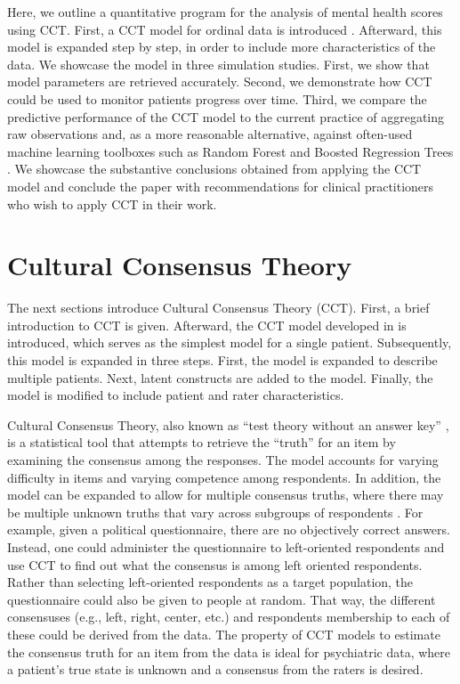 \documentclass{article}
\begin{document}
Here, we outline a quantitative program for the analysis of mental health scores using CCT. First, a CCT model for ordinal data is introduced \cite{Anders2015cultural}. Afterward, this model is expanded step by step, in order to include more characteristics of the data. We showcase the model in three simulation studies. First, we show that model parameters are retrieved accurately. Second, we demonstrate how CCT could be used to monitor patients progress over time. Third, we compare the predictive performance of the CCT model to the current practice of aggregating raw observations and, as a more reasonable alternative, against often-used machine learning toolboxes such as Random Forest \cite{breiman2001random} and Boosted Regression Trees \cite{friedman2002stochastic}. We showcase the substantive conclusions obtained from applying the CCT model and conclude the paper with recommendations for clinical practitioners who wish to apply CCT in their work.

\section*{Cultural Consensus Theory}
The next sections introduce Cultural Consensus Theory (CCT). First, a brief introduction to CCT is given. Afterward, the CCT model developed in  is introduced, which serves as the simplest model for a single patient. Subsequently, this model is expanded in three steps. First, the model is expanded to describe multiple patients. Next, latent constructs are added to the model. Finally, the model is modified to include patient and rater characteristics.

Cultural Consensus Theory, also known as ``test theory without an answer key'' \cite{batchelder1988test}, is a statistical tool that attempts to retrieve the ``truth'' for an item by examining the consensus among the responses. The model accounts for varying difficulty in items and varying competence among respondents. In addition, the model can be expanded to allow for multiple consensus truths, where there may be multiple unknown truths that vary across subgroups of respondents \cite{AndersBatchelder2012}. For example, given a political questionnaire, there are no objectively correct answers. Instead, one could administer the questionnaire to left-oriented respondents and use CCT to find out what the consensus is among left oriented respondents. Rather than selecting left-oriented respondents as a target population, the questionnaire could also be given to people at random. That way, the different consensuses (e.g., left, right, center, etc.) and respondents membership to each of these could be derived from the data. The property of CCT models to estimate the consensus truth for an item from the data is ideal for psychiatric data, where a patient's true state is unknown and a consensus from the raters is desired.
\end{document}
